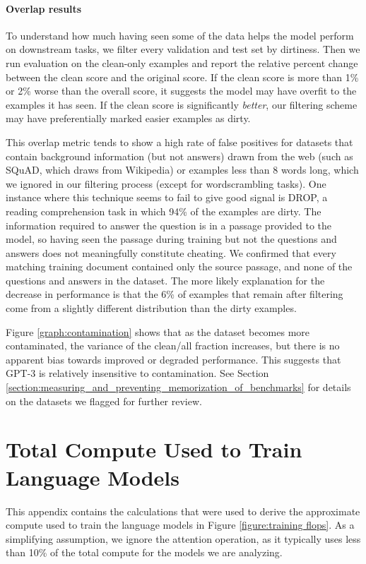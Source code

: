 \documentclass{article}
\begin{document}
\paragraph{Overlap results} To understand how much having seen some of the data helps the model perform on downstream tasks, we filter every validation and test set by dirtiness. Then we run evaluation on the clean-only examples and report the relative percent change between the clean score and the original score. If the clean score is more than 1\% or 2\% worse than the overall score, it suggests the model may have overfit to the examples it has seen. If the clean score is significantly \emph{better}, our filtering scheme may have preferentially marked easier examples as dirty.

This overlap metric tends to show a high rate of false positives for datasets that contain background information (but not answers) drawn from the web (such as SQuAD, which draws from Wikipedia) or examples less than 8 words long, which we ignored in our filtering process (except for wordscrambling tasks). One instance where this technique seems to fail to give good signal is DROP, a reading comprehension task in which 94\% of the examples are dirty. The information required to answer the question is in a passage provided to the model, so having seen the passage during training but not the questions and answers does not meaningfully constitute cheating. We confirmed that every matching training document contained only the source passage, and none of the questions and answers in the dataset. The more likely explanation for the decrease in performance is that the 6\% of examples that remain after filtering come from a slightly different distribution than the dirty examples.

Figure \ref{graph:contamination} shows that as the dataset becomes more contaminated, the variance of the clean/all fraction increases, but there is no apparent bias towards improved or degraded performance. This suggests that GPT-3 is relatively insensitive to contamination. See Section \ref{section:measuring_and_preventing_memorization_of_benchmarks} for details on the datasets we flagged for further review.
 \clearpage
\section{Total Compute Used to Train Language Models}
\label{appendix:total_compute_calculations}



This appendix contains the calculations that were used to derive the approximate compute used to train the language models in Figure \ref{figure:training flops}. As a simplifying assumption, we ignore the attention operation, as it typically uses less than 10\% of the total compute for the models we are analyzing.
\end{document}
